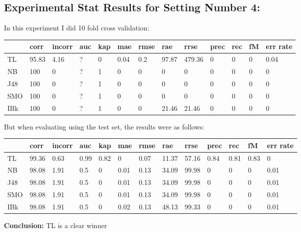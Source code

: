 \documentclass[a4paper,12pt, english]{article}
\begin{document}
\subsection{Experimental Stat Results for Setting Number 4:}
In this experiment I did 10 fold cross validation:
\begin{small}
\begin{center}
    \begin{tabular}{ | l | l | l | l | l | l | l | l | l | l | l | l | l |}
    \hline
      	& corr & incorr  & auc & kap & mae & rmse & rae & rrse & prec & rec & fM & err rate\\ \hline
      	TL & 95.83 & 4.16 & ? & 0 & 0.04 & 0.2 & 97.87 & 479.36 & 0 & 0 & 0 & 0.04\\ \hline
	NB & 100 & 0 & ? & 1 & 0 & 0 & 0 & 0 & 0 & 0 & 0 & 0\\ \hline
	J48 & 100 & 0 & ? & 1 & 0 & 0 & 0 & 0 & 0 & 0 & 0 & 0\\ \hline
	SMO & 100 & 0 & ? & 1 & 0 & 0 & 0 & 0 & 0 & 0 & 0 & 0\\ \hline
	IBk & 100 & 0 & ? & 1 & 0 & 0 & 21.46 & 21.46 & 0 & 0 & 0 & 0\\ \hline  
    \end{tabular}       
\end{center}
\end{small}

But when evaluating using the test set, the results were as follows:
\begin{small}
\begin{center}
    \begin{tabular}{ | l | l | l | l | l | l | l | l | l | l | l | l | l |}
    \hline
      	& corr & incorr  & auc & kap & mae & rmse & rae & rrse & prec & rec & fM & err rate\\ \hline
      	TL & 99.36 & 0.63 & 0.99 & 0.82 & 0 & 0.07 & 11.37 & 57.16 & 0.84 & 0.81 & 0.83 & 0\\ \hline
	NB & 98.08 & 1.91 & 0.5 & 0 & 0.01 & 0.13 & 34.09 & 99.98 & 0 & 0 & 0 & 0.01\\ \hline
	J48 & 98.08 & 1.91 & 0.5 & 0 & 0.01 & 0.13 & 34.09 & 99.98 & 0 & 0 & 0 & 0.01\\ \hline
	SMO & 98.08 & 1.91 & 0.5 & 0 & 0.01 & 0.13 & 34.09 & 99.98 & 0 & 0 & 0 & 0.01\\ \hline
	IBk & 98.08 & 1.91 & 0.5 & 0 & 0.02 & 0.13 & 48.13 & 99.33 & 0 & 0 & 0 & 0.01\\ \hline  
    \end{tabular}       
\end{center}
\end{small}
\textbf{Conclusion:} TL is a clear winner
\end{document}
